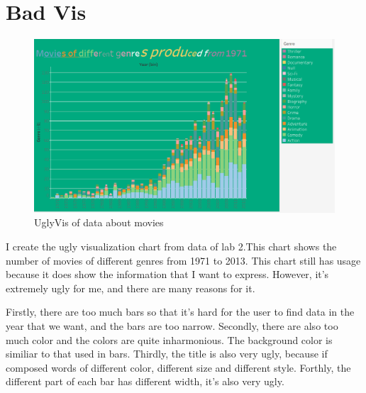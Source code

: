 \documentclass[a4paper]{article}
\begin{document}
\section{Bad Vis}
\begin{figure}[H]
    \centering
    \includegraphics[scale=0.4]{UglyVis.png}
    \caption{UglyVis of data about movies}
\end{figure}
I create the ugly visualization chart from data of lab 2.This chart shows the number of movies of different genres from 1971 to 2013. This chart still has usage because it does show the information that I want to express. However, it's extremely ugly for me, and there are many reasons for it.
\par Firstly, there are too much bars so that it's hard for the user to find data in the year that we want, and the bars are too narrow. Secondly, there are also too much color and the colors are quite inharmonious. The background color is similiar to that used in bars. Thirdly, the title is also very ugly, because if composed words of different color, different size and different style. Forthly, the different part of each bar has different width, it's also very ugly.
\end{document}
